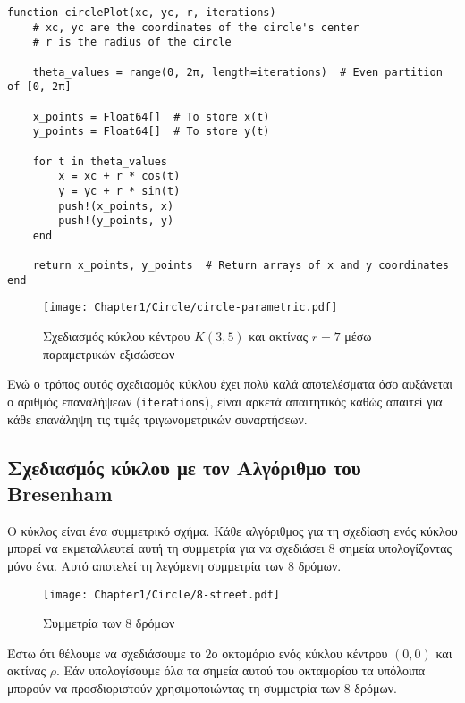 \begin{lstlisting}[caption={Αλγόριθμος Σχεδιασμού Κύκλου μέσω παραμετρικής εξίσωσης}]
function circlePlot(xc, yc, r, iterations)
    # xc, yc are the coordinates of the circle's center
    # r is the radius of the circle

    theta_values = range(0, 2π, length=iterations)  # Even partition of [0, 2π]

    x_points = Float64[]  # To store x(t)
    y_points = Float64[]  # To store y(t)

    for t in theta_values
        x = xc + r * cos(t)
        y = yc + r * sin(t)
        push!(x_points, x)
        push!(y_points, y)
    end

    return x_points, y_points  # Return arrays of x and y coordinates
end
\end{lstlisting}



\begin{figure}[h!]
  \begin{center}
\texttt{[image: Chapter1/Circle/circle-parametric.pdf]}
  \end{center}
  \caption{Σχεδιασμός κύκλου κέντρου $K(3,5)$ και ακτίνας $r=7$ μέσω παραμετρικών εξισώσεων}
\end{figure}

Ενώ ο τρόπος αυτός σχεδιασμός κύκλου έχει πολύ καλά αποτελέσματα όσο αυξάνεται ο αριθμός επαναλήψεων (\texttt{iterations}), είναι αρκετά απαιτητικός καθώς απαιτεί για κάθε επανάληψη τις τιμές τριγωνομετρικών συναρτήσεων.

\subsection{Σχεδιασμός κύκλου με τον Αλγόριθμο του Bresenham}

Ο κύκλος είναι ένα συμμετρικό σχήμα. Κάθε αλγόριθμος για τη σχεδίαση ενός κύκλου μπορεί να εκμεταλλευτεί αυτή τη συμμετρία για να σχεδιάσει $8$ σημεία υπολογίζοντας μόνο ένα. Αυτό αποτελεί τη λεγόμενη συμμετρία των $8$ δρόμων.

\begin{figure}[h!]
  \begin{center}
  \texttt{[image: Chapter1/Circle/8-street.pdf]}
  \end{center}
  \caption{Συμμετρία των 8 δρόμων}
\end{figure}


Έστω ότι θέλουμε να σχεδιάσουμε το $2$ο οκτομόριο ενός κύκλου κέντρου $(0,0)$ και ακτίνας $\rho$. Εάν υπολογίσουμε όλα τα σημεία αυτού του οκταμορίου τα υπόλοιπα μπορούν να προσδιοριστούν χρησιμοποιώντας τη συμμετρία των $8$ δρόμων.


